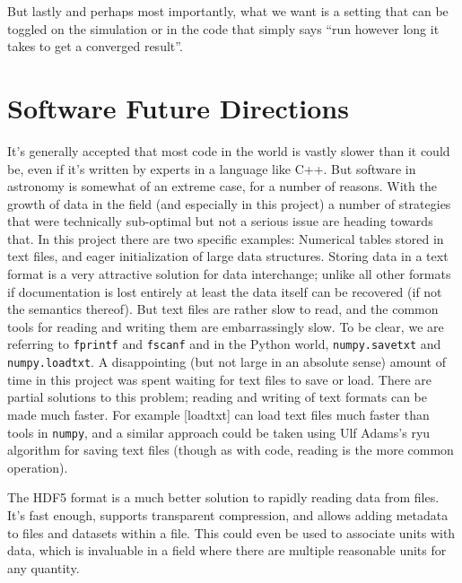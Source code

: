 But lastly and perhaps most importantly, what we want is a setting that can be toggled on the simulation or in the code that simply says ``run however long it takes to get a converged result''.

\section{Software Future Directions}

It's generally accepted that most code in the world is vastly slower than it could be, even if it's written by experts in a language like C++.
But software in astronomy is somewhat of an extreme case, for a number of reasons.
With the growth of data in the field (and especially in this project) a number of strategies that were technically sub-optimal but not a serious issue are heading towards that.
In this project there are two specific examples: Numerical tables stored in text files, and eager initialization of large data structures.
Storing data in a text format is a very attractive solution for data interchange; unlike all other formats if documentation is lost entirely at least the data itself can be recovered (if not the semantics thereof).
But text files are rather slow to read, and the common tools for reading and writing them are embarrassingly slow. To be clear, we are referring to \lstinline{fprintf} and \lstinline{fscanf} and in the Python world, \lstinline{numpy.savetxt} and \lstinline{numpy.loadtxt}.
A disappointing (but not large in an absolute sense) amount of time in this project was spent waiting for text files to save or load.
There are partial solutions to this problem; reading and writing of text formats can be made much faster.
For example \href{https://github.com/saethlin/loadtxt}[loadtxt] can load text files much faster than tools in \lstinline{numpy}, and a similar approach could be taken using Ulf Adams's ryu algorithm for saving text files (though as with code, reading is the more common operation).

The HDF5 format is a much better solution to rapidly reading data from files.
It's fast enough, supports transparent compression, and allows adding metadata to files and datasets within a file.
This could even be used to associate units with data, which is invaluable in a field where there are multiple reasonable units for any quantity.

